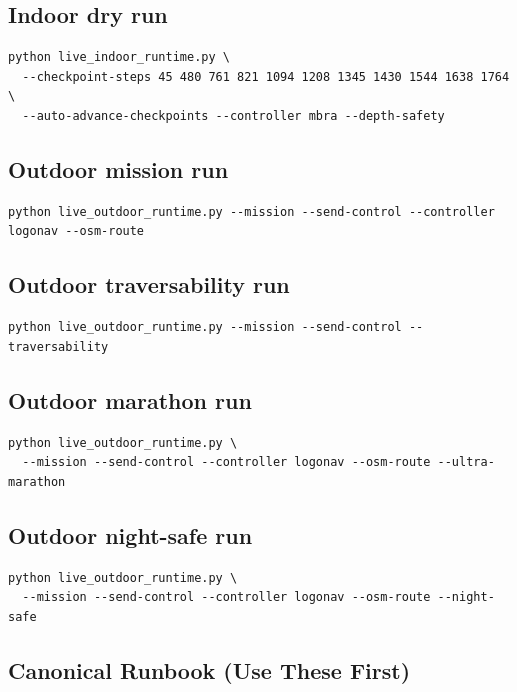 \documentclass[11pt]{article}
\begin{document}
\subsection{Indoor dry run}

\begin{verbatim}
python live_indoor_runtime.py \
  --checkpoint-steps 45 480 761 821 1094 1208 1345 1430 1544 1638 1764 \
  --auto-advance-checkpoints --controller mbra --depth-safety
\end{verbatim}

\subsection{Outdoor mission run}

\begin{verbatim}
python live_outdoor_runtime.py --mission --send-control --controller logonav --osm-route
\end{verbatim}

\subsection{Outdoor traversability run}

\begin{verbatim}
python live_outdoor_runtime.py --mission --send-control --traversability
\end{verbatim}

\subsection{Outdoor marathon run}

\begin{verbatim}
python live_outdoor_runtime.py \
  --mission --send-control --controller logonav --osm-route --ultra-marathon
\end{verbatim}

\subsection{Outdoor night-safe run}

\begin{verbatim}
python live_outdoor_runtime.py \
  --mission --send-control --controller logonav --osm-route --night-safe
\end{verbatim}

\subsection{Canonical Runbook (Use These First)}
\end{document}
